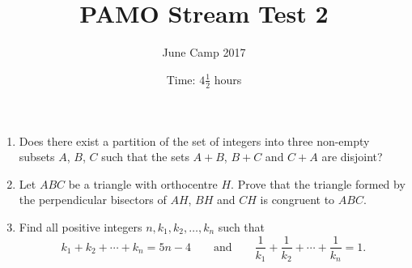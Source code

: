 \documentclass{article}
\title{PAMO Stream Test 2}
\author{June Camp 2017}
\date{Time: $4\frac{1}{2}$ hours}
\begin{document}
 \maketitle

\begin{enumerate}

\item %
	Does there exist a partition of the set of integers into three non-empty subsets $A$, $B$, $C$ such that the sets $A+B$, $B+C$ and $C+A$ are disjoint?

\item %
	Let $ABC$ be a triangle with orthocentre $H$. Prove that the triangle formed by the perpendicular bisectors of $AH$, $BH$ and $CH$ is congruent to $ABC$.

\item %
	Find all positive integers $n, k_1, k_2, \dotsc, k_n$ such that \[k_1 +k_2 +\dotsb +k_n = 5n-4 \qquad\text{and}\qquad \frac{1}{k_1} +\frac{1}{k_2} +\dotsb +\frac{1}{k_n} =1.\]

\end{enumerate}
\end{document}
